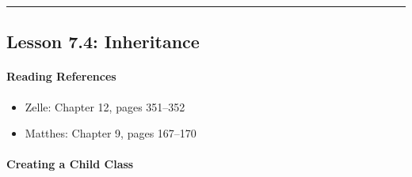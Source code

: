 \documentclass[
  justified,
  openright,
]{tufte-book}
\let\subsubsection\paragraph
\let\paragraph\paragraph
\let\subsubsection\paragraph
\let\paragraph\paragraph
\providecommand{\tightlist}{%
  \setlength{\itemsep}{0pt}\setlength{\parskip}{0pt}}
\begin{document}
\begin{center}\rule{0.5\linewidth}{0.5pt}\end{center}

\subsection{Lesson 7.4: Inheritance}\label{lesson-7.4-inheritance}

\subsubsection{Reading References}\label{reading-references-22}

\begin{itemize}
\tightlist
\item
  Zelle: Chapter 12, pages 351--352
\item
  Matthes: Chapter 9, pages 167--170
\end{itemize}

\subsubsection{Creating a Child Class}\label{creating-a-child-class}
\end{document}
